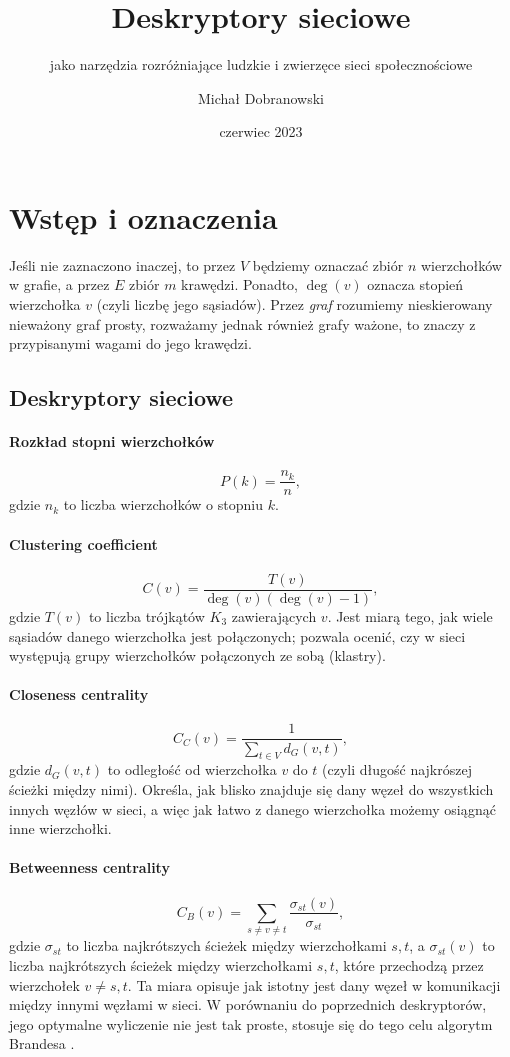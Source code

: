 \documentclass[11pt]{scrartcl}
\title{Deskryptory sieciowe}
\subtitle{jako narzędzia rozróżniające ludzkie i zwierzęce sieci społecznościowe}
\author{Michał Dobranowski}
\date{czerwiec 2023}
\begin{document}
\maketitle
\tableofcontents
\eject

\section{Wstęp i oznaczenia}
Jeśli nie zaznaczono inaczej, to przez $V$ będziemy oznaczać zbiór $n$ wierzchołków w grafie, a przez $E$ zbiór $m$ krawędzi. Ponadto, $\deg(v)$ oznacza stopień wierzchołka $v$ (czyli liczbę jego sąsiadów). Przez \textit{graf} rozumiemy nieskierowany nieważony graf prosty, rozważamy jednak również grafy ważone, to znaczy z przypisanymi wagami do jego krawędzi.

\subsection{Deskryptory sieciowe}
\paragraph*{Rozkład stopni wierzchołków}
\[ P(k) = \frac{n_k}{n}, \]
gdzie $n_k$ to liczba wierzchołków o stopniu $k$.

\paragraph*{Clustering coefficient}
\[ C(v) = \frac{T(v)}{\deg(v)(\deg(v) - 1)}, \]
gdzie $T(v)$ to liczba trójkątów $K_3$ zawierających $v$. Jest miarą tego, jak wiele sąsiadów danego wierzchołka jest połączonych; pozwala ocenić, czy w sieci występują grupy wierzchołków połączonych ze sobą (klastry).

\paragraph*{Closeness centrality}
\[ C_C(v) = \frac{1}{\sum\limits_{t \in V} d_G(v, t)}, \]
gdzie $d_G(v, t)$ to odległość od wierzchołka $v$ do $t$ (czyli długość najkrószej ścieżki między nimi). Określa, jak blisko znajduje się dany węzeł do wszystkich innych węzłów w sieci, a więc jak łatwo z danego wierzchołka możemy osiągnąć inne wierzchołki.

\paragraph*{Betweenness centrality}
\[ C_B(v) = \sum_{s\neq v\neq t} \frac{\sigma_{st}(v)}{\sigma_{st}}, \]
gdzie $\sigma_{st}$ to liczba najkrótszych ścieżek między wierzchołkami $s, t$, a $\sigma_{st}(v)$ to liczba najkrótszych ścieżek między wierzchołkami $s, t$, które przechodzą przez wierzchołek $v \neq s, t$. Ta miara opisuje jak istotny jest dany węzeł w komunikacji między innymi węzłami w sieci. W porównaniu do poprzednich deskryptorów, jego optymalne wyliczenie nie jest tak proste, stosuje się do tego celu algorytm Brandesa \cite{Brandes2001}.
\end{document}
